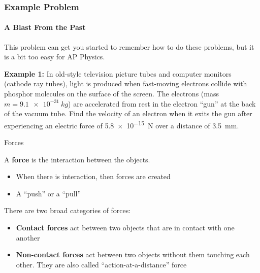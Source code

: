 \documentclass[12pt,compress,aspectratio=169]{beamer}
\begin{document}
\begin{frame}
  \frametitle{Example Problem}
  \framesubtitle{A Blast From the Past}
  This problem can get you started to remember how to do these problems, but it
  is a bit too easy for AP Physics.
  
  \vspace{.2in}\textbf{Example 1:} In old-style television picture tubes and
  computer monitors (cathode ray tubes), light is produced when fast-moving
  electrons collide with phosphor molecules on the surface of the screen. The
  electrons (mass $m=\SI{9.1e-31}{kg}$) are accelerated from rest in the
  electron ``gun'' at the back of the vacuum tube. Find the velocity of an
  electron when it exits the gun after experiencing an electric force of
  \SI{5.8e-15}{N} over a distance of \SI{3.5}{mm}.
\end{frame}



\begin{frame}{Forces}

  A \textbf{force} is the interaction between the objects.
  \begin{itemize}
  \item When there is interaction, then forces are created
  \item A ``push'' or a ``pull''
  \end{itemize}

  There are two broad categories of forces:
  \begin{itemize}
  \item\textbf{Contact forces} act between two objects that are in contact
    with one another
  \item\textbf{Non-contact forces} act between two objects without them
    touching each other. They are also called ``action-at-a-distance'' force
  \end{itemize}
\end{frame}
\end{document}
